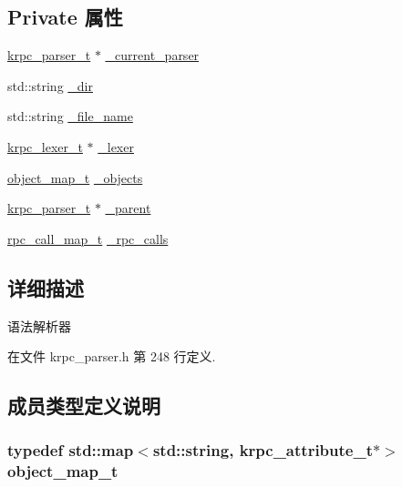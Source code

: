 \subsection*{Private 属性}
\begin{DoxyCompactItemize}
\item 
\hyperlink{classkrpc__parser__t}{krpc\+\_\+parser\+\_\+t} $\ast$ \hyperlink{classkrpc__parser__t_a9a1689a590c34f978bc63be9b7dc3d1d}{\+\_\+current\+\_\+parser}
\item 
std\+::string \hyperlink{classkrpc__parser__t_a2c2f62a9907553e5feb1ecef65c6c386}{\+\_\+dir}
\item 
std\+::string \hyperlink{classkrpc__parser__t_aabe9a05e7efc4b887c62ffd6cfd61fa8}{\+\_\+file\+\_\+name}
\item 
\hyperlink{classkrpc__lexer__t}{krpc\+\_\+lexer\+\_\+t} $\ast$ \hyperlink{classkrpc__parser__t_a7b21e509d9c4629900830ab5a2a69064}{\+\_\+lexer}
\item 
\hyperlink{classkrpc__parser__t_a2e43854d69b1505000c452feb196e4a6}{object\+\_\+map\+\_\+t} \hyperlink{classkrpc__parser__t_a1e6d4b7ed08d14795824c111ce052943}{\+\_\+objects}
\item 
\hyperlink{classkrpc__parser__t}{krpc\+\_\+parser\+\_\+t} $\ast$ \hyperlink{classkrpc__parser__t_a76215a2f96b4cacaf59f61bcd2217849}{\+\_\+parent}
\item 
\hyperlink{classkrpc__parser__t_a17e6cf9e3f91f90b0e06055f1d2be839}{rpc\+\_\+call\+\_\+map\+\_\+t} \hyperlink{classkrpc__parser__t_a384832cb4d7e8e7dd7fbc4e51e5ccf12}{\+\_\+rpc\+\_\+calls}
\end{DoxyCompactItemize}


\subsection{详细描述}
语法解析器 

在文件 krpc\+\_\+parser.\+h 第 248 行定义.



\subsection{成员类型定义说明}
\hypertarget{classkrpc__parser__t_a2e43854d69b1505000c452feb196e4a6}{}
\subsubsection[{object\+\_\+map\+\_\+t}]{\setlength{\rightskip}{0pt plus 5cm}typedef std\+::map$<$std\+::string, {\bf krpc\+\_\+attribute\+\_\+t}$\ast$$>$ {\bf object\+\_\+map\+\_\+t}}\label{classkrpc__parser__t_a2e43854d69b1505000c452feb196e4a6}


